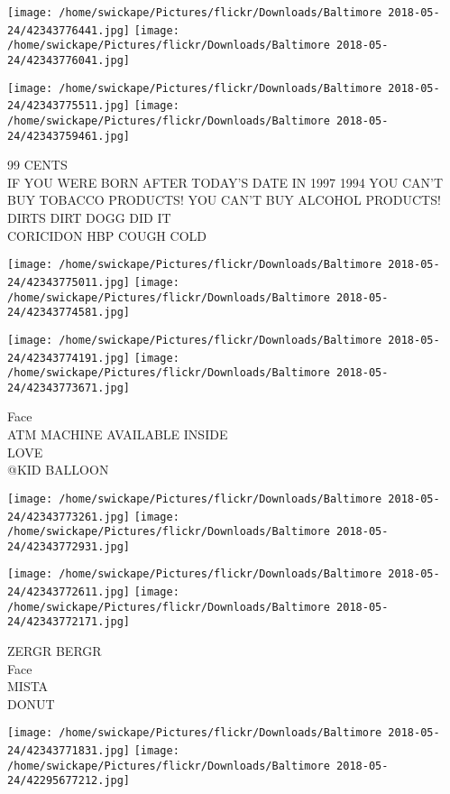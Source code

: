 \documentclass[10pt,letterpaper]{article}
\begin{document}
\texttt{[image: /home/swickape/Pictures/flickr/Downloads/Baltimore 2018-05-24/42343776441.jpg]}
\texttt{[image: /home/swickape/Pictures/flickr/Downloads/Baltimore 2018-05-24/42343776041.jpg]}

\texttt{[image: /home/swickape/Pictures/flickr/Downloads/Baltimore 2018-05-24/42343775511.jpg]}
\texttt{[image: /home/swickape/Pictures/flickr/Downloads/Baltimore 2018-05-24/42343759461.jpg]}

99 CENTS\\
IF YOU WERE BORN AFTER TODAY'S DATE IN 1997 1994 YOU CAN'T BUY TOBACCO PRODUCTS!  YOU CAN'T BUY ALCOHOL PRODUCTS!\\
DIRTS DIRT DOGG DID IT\\
CORICIDON HBP COUGH COLD
\pagebreak

\texttt{[image: /home/swickape/Pictures/flickr/Downloads/Baltimore 2018-05-24/42343775011.jpg]}
\texttt{[image: /home/swickape/Pictures/flickr/Downloads/Baltimore 2018-05-24/42343774581.jpg]}

\texttt{[image: /home/swickape/Pictures/flickr/Downloads/Baltimore 2018-05-24/42343774191.jpg]}
\texttt{[image: /home/swickape/Pictures/flickr/Downloads/Baltimore 2018-05-24/42343773671.jpg]}

Face\\
ATM MACHINE AVAILABLE INSIDE\\
LOVE\\
@KID BALLOON
\pagebreak

\texttt{[image: /home/swickape/Pictures/flickr/Downloads/Baltimore 2018-05-24/42343773261.jpg]}
\texttt{[image: /home/swickape/Pictures/flickr/Downloads/Baltimore 2018-05-24/42343772931.jpg]}

\texttt{[image: /home/swickape/Pictures/flickr/Downloads/Baltimore 2018-05-24/42343772611.jpg]}
\texttt{[image: /home/swickape/Pictures/flickr/Downloads/Baltimore 2018-05-24/42343772171.jpg]}

ZERGR BERGR\\
Face\\
MISTA\\
DONUT
\pagebreak

\texttt{[image: /home/swickape/Pictures/flickr/Downloads/Baltimore 2018-05-24/42343771831.jpg]}
\texttt{[image: /home/swickape/Pictures/flickr/Downloads/Baltimore 2018-05-24/42295677212.jpg]}
\end{document}
